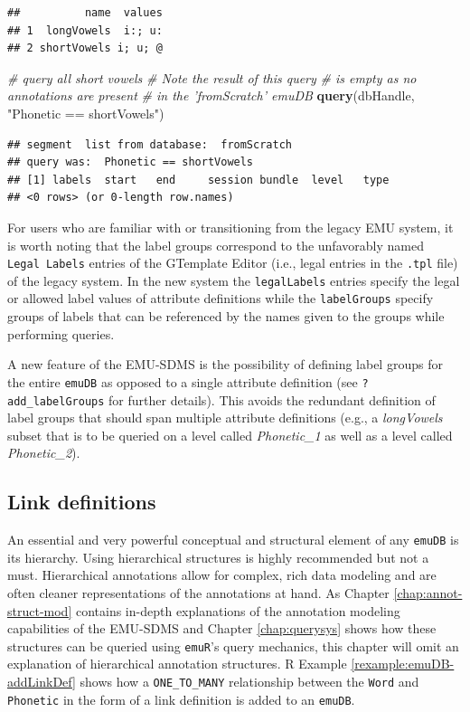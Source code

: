 \documentclass[]{book}
\newenvironment{Shaded}{\begin{snugshade}}{\end{snugshade}}
\newcommand{\CommentTok}[1]{\textcolor[rgb]{0.56,0.35,0.01}{\textit{#1}}}
\newcommand{\KeywordTok}[1]{\textcolor[rgb]{0.13,0.29,0.53}{\textbf{#1}}}
\newcommand{\NormalTok}[1]{#1}
\newcommand{\StringTok}[1]{\textcolor[rgb]{0.31,0.60,0.02}{#1}}
\theoremstyle{definition}
\theoremstyle{definition}
\theoremstyle{definition}
\theoremstyle{remark}
\begin{document}
\begin{verbatim}
##          name  values
## 1  longVowels  i:; u:
## 2 shortVowels i; u; @
\end{verbatim}

\begin{Shaded}
\begin{Highlighting}[]
\CommentTok{# query all short vowels}
\CommentTok{# Note the result of this query}
\CommentTok{# is empty as no annotations are present}
\CommentTok{# in the 'fromScratch' emuDB}
\KeywordTok{query}\NormalTok{(dbHandle, }\StringTok{"Phonetic == shortVowels"}\NormalTok{)}
\end{Highlighting}
\end{Shaded}

\begin{verbatim}
## segment  list from database:  fromScratch 
## query was:  Phonetic == shortVowels 
## [1] labels  start   end     session bundle  level   type   
## <0 rows> (or 0-length row.names)
\end{verbatim}

For users who are familiar with or transitioning from the legacy EMU
system, it is worth noting that the label groups correspond to the
unfavorably named \texttt{Legal\ Labels} entries of the GTemplate Editor
(i.e., legal entries in the \texttt{.tpl} file) of the legacy system. In
the new system the \texttt{legalLabels} entries specify the legal or
allowed label values of attribute definitions while the
\texttt{labelGroups} specify groups of labels that can be referenced by
the names given to the groups while performing queries.

A new feature of the EMU-SDMS is the possibility of defining label
groups for the entire \texttt{emuDB} as opposed to a single attribute
definition (see \texttt{?add\_labelGroups} for further details). This
avoids the redundant definition of label groups that should span
multiple attribute definitions (e.g., a \emph{longVowels} subset that is
to be queried on a level called \emph{Phonetic\_1} as well as a level
called \emph{Phonetic\_2}).

\hypertarget{link-definitions}{%
\subsection{Link definitions}\label{link-definitions}}

An essential and very powerful conceptual and structural element of any
\texttt{emuDB} is its hierarchy. Using hierarchical structures is highly
recommended but not a must. Hierarchical annotations allow for complex,
rich data modeling and are often cleaner representations of the
annotations at hand. As Chapter \ref{chap:annot-struct-mod} contains
in-depth explanations of the annotation modeling capabilities of the
EMU-SDMS and Chapter \ref{chap:querysys} shows how these structures can
be queried using \texttt{emuR}'s query mechanics, this chapter will omit
an explanation of hierarchical annotation structures. R Example
\ref{rexample:emuDB-addLinkDef} shows how a \texttt{ONE\_TO\_MANY}
relationship between the \texttt{Word} and \texttt{Phonetic} in the form
of a link definition is added to an \texttt{emuDB}.
\end{document}
